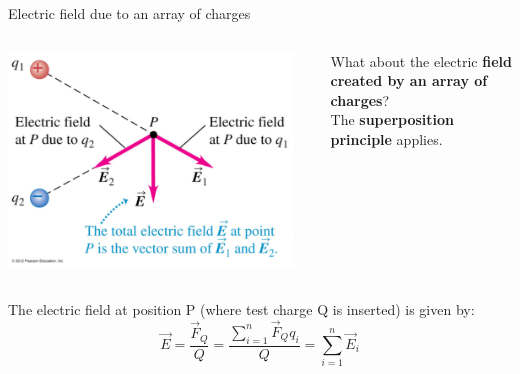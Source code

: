 \begin{frame}{Electric field due to an array of charges}

\begin{columns}
  \begin{column}{0.60\textwidth}
   \begin{center}
     \includegraphics[width=0.95\textwidth]{./images/schematics/electric_field_superposition.png}\\
   \end{center}
  \end{column}
  \begin{column}{0.40\textwidth}
     What about the electric {\bf field created by an array of charges}?\\
     \vspace{0.4cm}
     The {\bf superposition principle} applies.
  \end{column}
\end{columns}
\vspace{0.2cm}
The electric field at position P (where test charge Q is inserted) is given by:
\begin{equation*}
\displaystyle
   \vec{E} = \frac{\vec{F}_Q}{Q} = \frac{\sum_{i=1}^{n} \vec{F}_Qq_{i}}{Q} = \sum_{i=1}^{n} \vec{E}_i
\end{equation*}

\end{frame}


%
%
%

